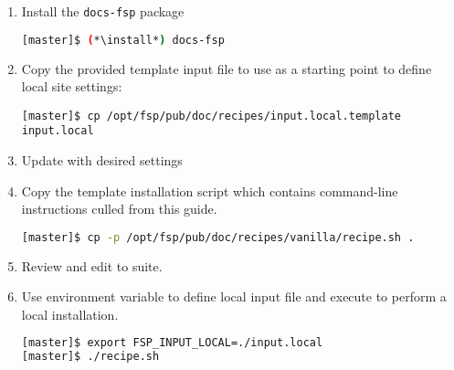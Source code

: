 \begin{enumerate}
\item Install the \texttt{docs-fsp} package

\begin{lstlisting}[language=bash,keywords={}]
[master]$ (*\install*) docs-fsp
\end{lstlisting}

\item Copy the provided template input file to use as a starting point to
  define local site settings:
\begin{lstlisting}
[master]$ cp /opt/fsp/pub/doc/recipes/input.local.template input.local
\end{lstlisting}

\item Update  with desired settings

\item Copy the template installation script which contains command-line
  instructions culled from this guide.

\begin{lstlisting}[language=bash,keywords={}]
[master]$ cp -p /opt/fsp/pub/doc/recipes/vanilla/recipe.sh .
\end{lstlisting}

\item Review and edit  to suite.

\item Use environment variable to define local input file and execute
   to perform a local installation.

\begin{lstlisting}[language=bash,keywords={}]
[master]$ export FSP_INPUT_LOCAL=./input.local
[master]$ ./recipe.sh
\end{lstlisting}
\end{enumerate}



